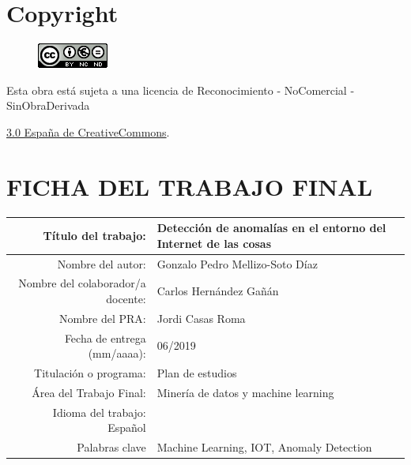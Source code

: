 \setcounter{page}{1} 
\pagestyle{plain}

\chapter*{Copyright}

\vspace{1cm}

\begin{figure}[ht]
    \centering
	\includegraphics[scale=1]{images/license.png}
\end{figure}

Esta obra está sujeta a una licencia de Reconocimiento -  NoComercial - SinObraDerivada

\href{https://creativecommons.org/licenses/by-nc-nd/3.0/es/}{3.0 España de CreativeCommons}.

\chapter*{FICHA DEL TRABAJO FINAL}

\begin{table}[ht]
	\centering{}
	\renewcommand{\arraystretch}{2}
	\begin{tabular}{r | l}
		\hline
		Título del trabajo: & Detección de anomalías en el entorno del Internet de las cosas\\
		\hline
        Nombre del autor: & Gonzalo Pedro Mellizo-Soto Díaz\\
		\hline
        Nombre del colaborador/a docente: & Carlos Hernández Gañán\\
		\hline
        Nombre del PRA: & Jordi Casas Roma\\
		\hline
        Fecha de entrega (mm/aaaa): & 06/2019\\
		\hline
        Titulación o programa: & Plan de estudios\\
		\hline
        Área del Trabajo Final: & Minería de datos y machine learning \\
		\hline
        Idioma del trabajo: Español\\
		\hline
        Palabras clave & Machine Learning, IOT, Anomaly Detection\\
		\hline
	\end{tabular}
\end{table}

